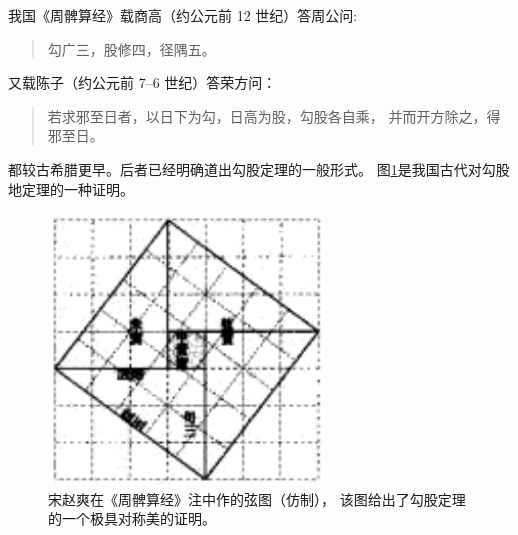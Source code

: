 \documentclass[hyperref,UTF8,c5size]{ctexart}
\newenvironment{myquote}
{\begin{quote}\kaishu\zihao{-5}}
{\end{quote}}
\begin{document}
        我国《周髀算经》载商高（约公元前 12 世纪）答周公问:
        \begin{myquote}
                勾广三，股修四，径隅五。
        \end{myquote}
        又载陈子（约公元前 7--6 世纪）答荣方问：
        \begin{myquote}
                若求邪至日者，以日下为勾，日高为股，勾股各自乘，
                并而开方除之，得邪至日。
        \end{myquote}
        都较古希腊更早。后者已经明确道出勾股定理的一般形式。
        图\ref{fig:xiantu}是我国古代对勾股地定理的一种证明\cite{quanjing}。
	\begin{figure}[ht]
	        \centering
	        \includegraphics[scale=0.6]{xiantu.png}
	        \caption{宋赵爽在《周髀算经》注中作的弦图（仿制），
	                该图给出了勾股定理的一个极具对称美的证明。}
	        \label{fig:xiantu}
	\end{figure}
\end{document}
